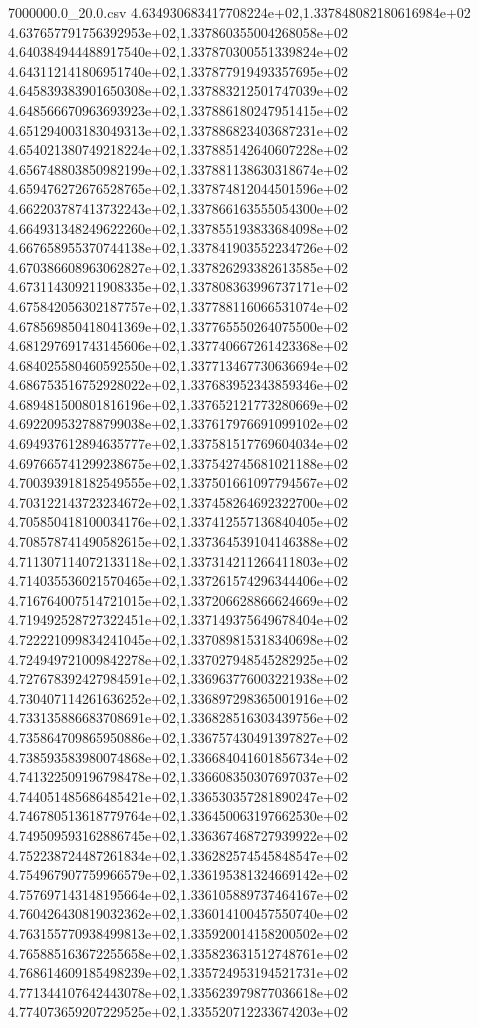 \begin{filecontents*}{7000000.0_20.0.csv}
4.634930683417708224e+02,1.337848082180616984e+02
4.637657791756392953e+02,1.337860355004268058e+02
4.640384944488917540e+02,1.337870300551339824e+02
4.643112141806951740e+02,1.337877919493357695e+02
4.645839383901650308e+02,1.337883212501747039e+02
4.648566670963693923e+02,1.337886180247951415e+02
4.651294003183049313e+02,1.337886823403687231e+02
4.654021380749218224e+02,1.337885142640607228e+02
4.656748803850982199e+02,1.337881138630318674e+02
4.659476272676528765e+02,1.337874812044501596e+02
4.662203787413732243e+02,1.337866163555054300e+02
4.664931348249622260e+02,1.337855193833684098e+02
4.667658955370744138e+02,1.337841903552234726e+02
4.670386608963062827e+02,1.337826293382613585e+02
4.673114309211908335e+02,1.337808363996737171e+02
4.675842056302187757e+02,1.337788116066531074e+02
4.678569850418041369e+02,1.337765550264075500e+02
4.681297691743145606e+02,1.337740667261423368e+02
4.684025580460592550e+02,1.337713467730636694e+02
4.686753516752928022e+02,1.337683952343859346e+02
4.689481500801816196e+02,1.337652121773280669e+02
4.692209532788799038e+02,1.337617976691099102e+02
4.694937612894635777e+02,1.337581517769604034e+02
4.697665741299238675e+02,1.337542745681021188e+02
4.700393918182549555e+02,1.337501661097794567e+02
4.703122143723234672e+02,1.337458264692322700e+02
4.705850418100034176e+02,1.337412557136840405e+02
4.708578741490582615e+02,1.337364539104146388e+02
4.711307114072133118e+02,1.337314211266411803e+02
4.714035536021570465e+02,1.337261574296344406e+02
4.716764007514721015e+02,1.337206628866624669e+02
4.719492528727322451e+02,1.337149375649678404e+02
4.722221099834241045e+02,1.337089815318340698e+02
4.724949721009842278e+02,1.337027948545282925e+02
4.727678392427984591e+02,1.336963776003221938e+02
4.730407114261636252e+02,1.336897298365001916e+02
4.733135886683708691e+02,1.336828516303439756e+02
4.735864709865950886e+02,1.336757430491397827e+02
4.738593583980074868e+02,1.336684041601856734e+02
4.741322509196798478e+02,1.336608350307697037e+02
4.744051485686485421e+02,1.336530357281890247e+02
4.746780513618779764e+02,1.336450063197662530e+02
4.749509593162886745e+02,1.336367468727939922e+02
4.752238724487261834e+02,1.336282574545848547e+02
4.754967907759966579e+02,1.336195381324669142e+02
4.757697143148195664e+02,1.336105889737464167e+02
4.760426430819032362e+02,1.336014100457550740e+02
4.763155770938499813e+02,1.335920014158200502e+02
4.765885163672255658e+02,1.335823631512748761e+02
4.768614609185498239e+02,1.335724953194521731e+02
4.771344107642443078e+02,1.335623979877036618e+02
4.774073659207229525e+02,1.335520712233674203e+02

\end{filecontents*}
